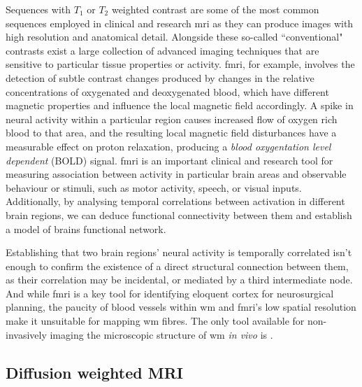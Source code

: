 Sequences with $T_1$ or $T_2$ weighted contrast are some of the most common sequences employed in clinical and research \gls{mri} as they can produce images with high resolution and anatomical detail.
Alongside these so-called ``conventional" contrasts exist a large collection of advanced imaging techniques that are sensitive to particular tissue properties or activity.
\Gls{fmri}, for example, involves the detection of subtle contrast changes produced by changes in the relative concentrations of oxygenated and deoxygenated blood, which have different magnetic properties and influence the local magnetic field accordingly.
A spike in neural activity within a particular region causes increased flow of oxygen rich blood to that area, and the resulting local magnetic field disturbances have a measurable effect on proton relaxation, producing a \textit{blood oxygentation level dependent} (BOLD) signal.
\gls{fmri} is an important clinical and research tool for measuring association between activity in particular brain areas and observable behaviour or stimuli, such as motor activity, speech, or visual inputs.
Additionally, by analysing temporal correlations between activation in different brain regions, we can deduce functional connectivity between them and establish a model of brains functional network.

Establishing that two brain regions' neural activity is temporally correlated isn't enough to confirm the existence of a direct structural connection between them, as their correlation may be incidental, or mediated by a third intermediate node.
And while \gls{fmri} is a key tool for identifying eloquent cortex for neurosurgical planning, the paucity of blood vessels within \gls{wm} and \gls{fmri}'s low spatial resolution make it unsuitable for mapping \gls{wm} fibres.
The only tool available for non-invasively imaging the microscopic structure of \gls{wm} \textit{in vivo} is .

\subsection{Diffusion weighted MRI}\label{sec:dmri}


